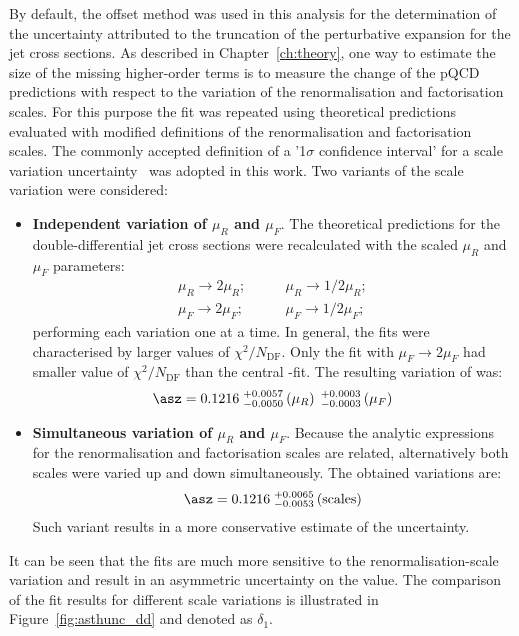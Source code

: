 By default, the offset method was used in this analysis for the determination of the uncertainty attributed to the truncation of the perturbative expansion for the jet cross sections. As described in Chapter~\ref{ch:theory}, one way to estimate 
the size of the missing higher-order terms is to measure the change of the pQCD predictions with respect to the variation of the renormalisation and factorisation scales. For this purpose the \asz fit was repeated using theoretical predictions evaluated with modified definitions of the renormalisation and factorisation scales. The commonly accepted definition of a '1$\sigma$ confidence interval' for a scale variation uncertainty~\cite{soper:1997} was adopted in this work. Two variants of the scale variation were considered:
\begin{itemize}
 \item \textbf{Independent variation of $\mu_R$ and $\mu_F$}. The theoretical predictions for the double-differential jet cross sections were recalculated with the scaled $\mu_R$ and $\mu_F$ parameters:
\begin{align}
 \mu_R \rightarrow 2\mu_R;&\qquad \mu_R \rightarrow 1/2\mu_R;\\
 \mu_F \rightarrow 2\mu_F;&\qquad \mu_F \rightarrow 1/2\mu_F;
\end{align}
performing each variation one at a time. In general, the fits were characterised by larger values of $\chi^2/N_\text{DF}$. Only the fit with $\mu_F \rightarrow 2\mu_F$ had smaller value of $\chi^2/N_\text{DF}$ than the central \asz-fit. The resulting variation of \asz was:
\begin{equation}
 \asz = 0.1216\;^{+0.0057}_{-0.0050}\left(\mu_R\right)\;^{+0.0003}_{-0.0003}\left(\mu_F\right)
\end{equation}
\item \textbf{Simultaneous variation of $\mu_R$ and $\mu_F$}. Because the analytic expressions for the renormalisation and factorisation scales are related, alternatively both scales were varied up and down simultaneously. The obtained variations are:
\begin{equation}
 \asz = 0.1216\;^{+0.0065}_{-0.0053}\left(\text{scales}\right)
\end{equation}
Such variant results in a more conservative estimate of the uncertainty. 
\end{itemize}
It can be seen that the fits are much more sensitive to the renormalisation-scale variation and result in an asymmetric uncertainty on the \asz value. The comparison of the fit results for different scale variations is illustrated in Figure~\ref{fig:asthunc_dd} and denoted as $\delta_1$.

